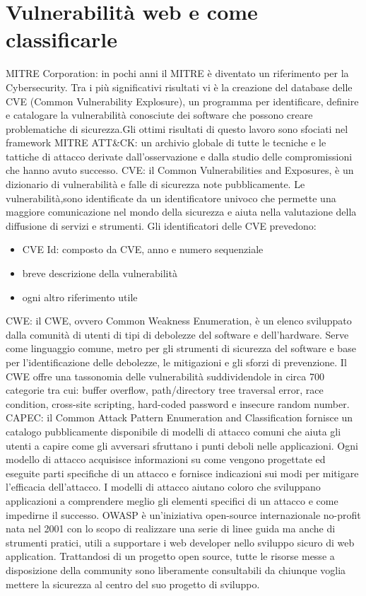 \section{Vulnerabilità web e come classificarle} 
\cite{MITRE&CVE}
\cite{CVE}
MITRE Corporation: in pochi anni il MITRE è diventato un riferimento per la Cybersecurity. Tra i più significativi risultati vi è la creazione del database delle CVE (Common Vulnerability Explosure), un programma per identificare, definire e catalogare la vulnerabilità conosciute dei software che possono creare problematiche di sicurezza.Gli ottimi risultati di questo lavoro sono sfociati nel framework MITRE ATT\&CK: un archivio globale di tutte le tecniche e le tattiche di attacco derivate dall’osservazione e dalla studio delle compromissioni che hanno avuto successo.
CVE: il Common Vulnerabilities and Exposures, è un dizionario di vulnerabilità e falle di sicurezza note pubblicamente. Le vulnerabilità,sono identificate da un identificatore univoco che permette una maggiore comunicazione nel mondo della sicurezza e aiuta nella valutazione della diffusione di servizi e strumenti. Gli identificatori delle CVE prevedono:
\begin{itemize}
    \item CVE Id: composto da CVE, anno e numero sequenziale
    \item breve descrizione della vulnerabilità
    \item ogni altro riferimento utile 
\end{itemize}
\cite{rischiodigitale}
CWE: il CWE, ovvero Common Weakness Enumeration, è un elenco sviluppato dalla comunità di utenti di tipi di debolezze del software e dell’hardware. Serve come linguaggio comune, metro per gli strumenti di sicurezza del software e base per l’identificazione delle debolezze, le mitigazioni e gli sforzi di prevenzione. Il CWE offre una tassonomia delle vulnerabilità suddividendole in circa 700 categorie tra cui: buffer overflow, path/directory tree traversal error, race condition, cross-site scripting, hard-coded password e insecure random number.
CAPEC: il Common Attack Pattern Enumeration and Classification fornisce un catalogo pubblicamente disponibile di modelli di attacco comuni che aiuta gli utenti a capire come gli avversari sfruttano i punti deboli nelle applicazioni.
Ogni modello di attacco acquisisce informazioni su come vengono progettate ed eseguite parti specifiche di un attacco e fornisce indicazioni sui modi per mitigare l'efficacia dell'attacco. I modelli di attacco aiutano coloro che sviluppano applicazioni a comprendere meglio gli elementi specifici di un attacco e come impedirne il successo.
OWASP è un’iniziativa open-source internazionale no-profit nata nel 2001 con lo scopo di realizzare una serie di linee guida ma anche di strumenti pratici, utili a supportare i web developer nello sviluppo sicuro di web application.
Trattandosi di un progetto open source, tutte le risorse messe a disposizione della community sono liberamente consultabili da chiunque voglia mettere la sicurezza al centro del suo progetto di sviluppo.

